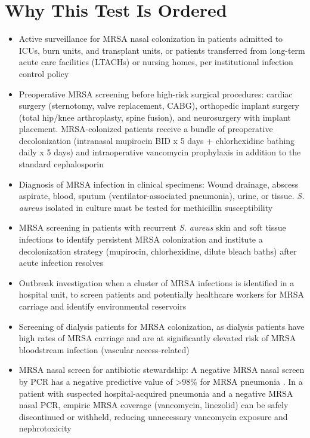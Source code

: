 \section*{Why This Test Is Ordered}
\begin{itemize}
  \item Active surveillance for MRSA nasal colonization in patients admitted to ICUs, burn units, and transplant units, or patients transferred from long-term acute care facilities (LTACHs) or nursing homes, per institutional infection control policy
  \item Preoperative MRSA screening before high-risk surgical procedures: cardiac surgery (sternotomy, valve replacement, CABG), orthopedic implant surgery (total hip/knee arthroplasty, spine fusion), and neurosurgery with implant placement. MRSA-colonized patients receive a bundle of preoperative decolonization (intranasal mupirocin BID x 5 days + chlorhexidine bathing daily x 5 days) and intraoperative vancomycin prophylaxis in addition to the standard cephalosporin
  \item Diagnosis of MRSA infection in clinical specimens: Wound drainage, abscess aspirate, blood, sputum (ventilator-associated pneumonia), urine, or tissue. \textit{S. aureus} isolated in culture must be tested for methicillin susceptibility
  \item MRSA screening in patients with recurrent \textit{S. aureus} skin and soft tissue infections to identify persistent MRSA colonization and institute a decolonization strategy (mupirocin, chlorhexidine, dilute bleach baths) after acute infection resolves
  \item Outbreak investigation when a cluster of MRSA infections is identified in a hospital unit, to screen patients and potentially healthcare workers for MRSA carriage and identify environmental reservoirs
  \item Screening of dialysis patients for MRSA colonization, as dialysis patients have high rates of MRSA carriage and are at significantly elevated risk of MRSA bloodstream infection (vascular access-related)
  \item MRSA nasal screen for antibiotic stewardship: A negative MRSA nasal screen by PCR has a negative predictive value of >98\% for MRSA pneumonia \cite{parente2018clinical}. In a patient with suspected hospital-acquired pneumonia and a negative MRSA nasal PCR, empiric MRSA coverage (vancomycin, linezolid) can be safely discontinued or withheld, reducing unnecessary vancomycin exposure and nephrotoxicity
\end{itemize}

